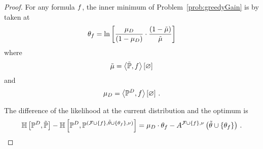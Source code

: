 \begin{proof}
	For any formula $f$, the inner minimum of Problem~\eqref{prob:greedyGain} is by  taken at
		\[ \theta_{f} = \ln \left[ \frac{\mu_{D}}{(1-\mu_{D})}\cdot \frac{(1-\tilde{\mu})}{\tilde{\mu}} \right]  \]
	where
		\[ \tilde{\mu} = \left\langle \tilde{\mathbb{P}},f\right\rangle \left[ \varnothing \right] \]
	and
		\[ \mu_{D} = \left\langle \mathbb{P}^{D},f\right\rangle \left[ \varnothing \right] \, . \]
	
	The difference of the likelihood at the current distribution and the optimum is
	\begin{align*}
		\mathbb{H}\left[\mathbb{P}^{D},\tilde{\mathbb{P}}\right]
		- \mathbb{H}\left[\mathbb{P}^{D},\mathbb{P}^{(\mathcal{F}\cup\{f\},\tilde{\theta}\cup\{\theta_{f}\},\nu)}\right]
		= \mu_{D} \cdot \theta_{f} - A^{\mathcal{F}\cup\{f\},\nu}\left(\tilde{\theta}\cup\{\theta_{f}\}\right) \, .
	\end{align*}
	

\end{proof}
